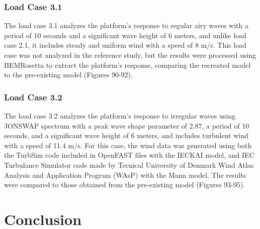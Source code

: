 \documentclass[a4paper, 11pt]{article}
\begin{document}
\subsubsection{Load Case 3.1}
\hspace*{0.5cm}The load case 3.1 analyzes the platform's response to regular airy waves with a period of 10 seconds and a significant wave height of 6 meters, and unlike load case 2.1, it includes steady and uniform wind with a speed of 8 m/s. This load case was not analyzed in the reference study, but the results were processed using BEMRosetta to extract the platform's response, comparing the recreated model to the pre-existing model (Figures 90-92).

\subsubsection{Load Case 3.2}
\hspace*{0.5cm}The load case 3.2 analyzes the platform's response to irregular waves using JONSWAP spectrum with a peak wave shape parameter of 2.87, a period of 10 seconds, and a significant wave height of 6 meters, and includes turbulent wind with a speed of 11.4 m/s. For this case, the wind data was generated using both the TurbSim code included in OpenFAST files with the IECKAI model, and IEC Turbulance Simulator code made by Tecnical University of Denmark Wind Atlas Analysis and Application Program (WAsP) with the Mann model. The results were compared to those obtained from the pre-existing model (Figures 93-95).


\section{Conclusion}%
\end{document}
